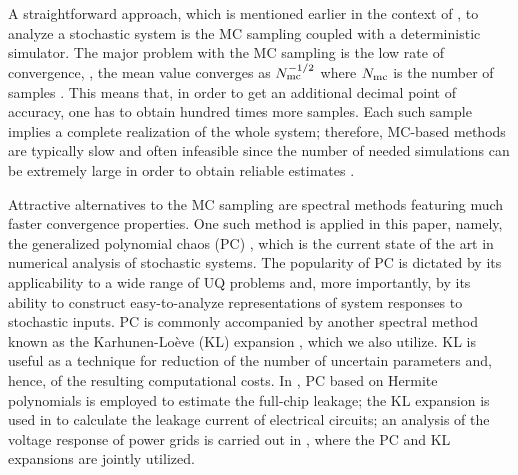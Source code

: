 
A straightforward approach, which is mentioned earlier in the context of \cite{chandra2010}, to analyze a stochastic system is the MC sampling coupled with a deterministic simulator. The major problem with the MC sampling is the low rate of convergence, \eg, the mean value converges as $N_\text{mc}^{-{{1}/{2}}}$ where $N_\text{mc}$ is the number of samples \cite{xiu2010, maitre2010}. This means that, in order to get an additional decimal point of accuracy, one has to obtain hundred times more samples. Each such sample implies a complete realization of the whole system; therefore, MC-based methods are typically slow and often infeasible since the number of needed simulations can be extremely large in order to obtain reliable estimates \cite{diaz-emparanza2002}.

Attractive alternatives to the MC sampling are spectral methods \cite{xiu2010, maitre2010} featuring much faster convergence properties. One such method is applied in this paper, namely, the generalized polynomial chaos (PC) \cite{xiu2002}, which is the current state of the art in numerical analysis of stochastic systems. The popularity of PC is dictated by its applicability to a wide range of UQ problems and, more importantly, by its ability to construct easy-to-analyze representations of system responses to stochastic inputs. PC is commonly accompanied by another spectral method known as the Karhunen-Lo\`{e}ve (KL) expansion \cite{ghanem1991}, which we also utilize. KL is useful as a technique for reduction of the number of uncertain parameters and, hence, of the resulting computational costs. In \cite{shen2009}, PC based on Hermite polynomials is employed to estimate the full-chip leakage; the KL expansion is used in \cite{bhardwaj2006} to calculate the leakage current of electrical circuits; an analysis of the voltage response of power grids is carried out in \cite{ghanta2006}, where the PC and KL expansions are jointly utilized.

